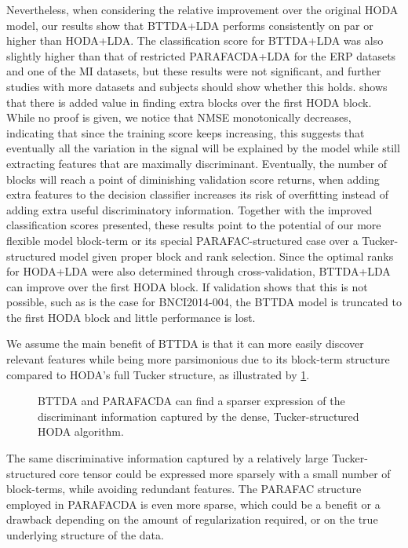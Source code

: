 Nevertheless, when considering the relative improvement over the original
HODA model, our results show that BTTDA+LDA performs consistently on par or
higher than HODA+LDA.
The classification score for BTTDA+LDA was also slightly
higher than that of
restricted PARAFACDA+LDA for the ERP datasets and one of the MI datasets, but these
results were not significant, and further studies with more datasets and
subjects should show whether this holds.
 shows that there is added value in finding extra blocks
over the first HODA block.
While no proof is given, we notice that NMSE monotonically decreases, indicating that
since the training score keeps increasing, this suggests that
eventually all the variation in the signal will be explained by the model
while still extracting features that are maximally discriminant.
Eventually, the number of blocks will reach a point of diminishing validation
score returns, when adding extra features to the decision classifier increases
its risk of overfitting instead of adding extra useful discriminatory
information.
Together with the improved classification scores presented, these results
point to the potential of our more flexible model block-term or
its special PARAFAC-structured case over a Tucker-structured model given proper block and
rank selection.
Since the optimal ranks for HODA+LDA were also determined through
cross-validation, BTTDA+LDA can improve over the first HODA block.
If validation shows that this is not possible, such as is the case for
BNCI2014-004, the BTTDA model is truncated to the first HODA block and little
performance is lost.

We assume the main benefit of BTTDA is that it can more easily discover relevant
features while
being more parsimonious due to its block-term structure compared to HODA's full
Tucker structure, as illustrated by \cref{fig:bttda/sparse}.
\begin{figure}
  
  \caption[Sparsity of BTTDA and PARAFACDA]{BTTDA and PARAFACDA can find a
  sparser expression of the discriminant information captured by the dense,
  Tucker-structured HODA algorithm.}
  \label{fig:bttda/sparse}
\end{figure}
The same discriminative information captured by a relatively large
Tucker-structured core tensor could be expressed more sparsely with a small
number of block-terms, while avoiding redundant features.
The PARAFAC structure employed in PARAFACDA is even more sparse, which could be
a benefit or a drawback depending on the amount of regularization required,
or on the true underlying structure of the data.

